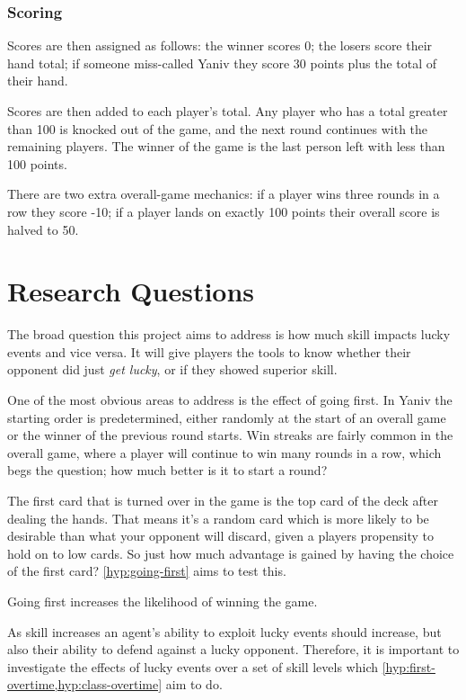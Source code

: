 \documentclass[../main.tex]{subfiles}
\begin{document}
\subsubsection{Scoring}
Scores are then assigned as follows: the winner scores 0; the losers score their hand total; if someone miss-called Yaniv they score 30 points plus the total of their hand. 

Scores are then added to each player's total. Any player who has a total greater than 100 is knocked out of the game, and the next round continues with the remaining players. The winner of the game is the last person left with less than 100 points.

There are two extra overall-game mechanics: if a player wins three rounds in a row they score -10; if a player lands on exactly 100 points their overall score is halved to 50.

\section{Research Questions} \label{intro:reserach-qs}
The broad question this project aims to address is how much skill impacts lucky events and vice versa. It will give players the tools to know whether their opponent did just \textit{get lucky}, or if they showed superior skill. 

One of the most obvious areas to address is the effect of going first. In Yaniv the starting order is predetermined, either randomly at the start of an overall game or the winner of the previous round starts. Win streaks are fairly common in the overall game, where a player will continue to win many rounds in a row, which begs the question; how much better is it to start a round? 

The first card that is turned over in the game is the top card of the deck after dealing the hands. That means it's a random card which is more likely to be desirable than what your opponent will discard, given a players propensity to hold on to low cards. So just how much advantage is gained by having the choice of the first card? \cref{hyp:going-first} aims to test this.

\begin{hyp} \label{hyp:going-first}
Going first increases the likelihood of winning the game.
\end{hyp}

As skill increases an agent's ability to exploit lucky events should increase, but also their ability to defend against a lucky opponent. Therefore, it is important to investigate the effects of lucky events over a set of skill levels which \cref{hyp:first-overtime,hyp:class-overtime} aim to do. 
\end{document}
